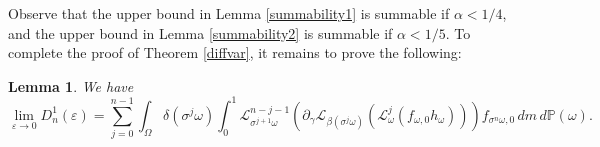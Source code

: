 \documentclass[12pt,reqno,a4paper]{article}
\newtheorem{lemma}[theorem]{Lemma}
\begin{document}

Observe that the upper bound in Lemma \ref{summability1} 
is summable
if $\alpha < 1/4$, and the upper bound in Lemma \ref{summability2}
is summable if $\alpha < 1/5$. To complete the proof of 
Theorem \ref{diffvar}, it remains to prove the following:


\begin{lemma}\label{limitexists2}
	We have
	\[
	\lim_{\varepsilon \to 0}D_n^1(\varepsilon)=\sum_{j=0}^{n-1}\int_\Omega \delta (\sigma^j \omega)\int_0^1\mathcal L_{\sigma^{j+1}\omega}^{n-j-1} \left (\partial_\gamma \mathcal L_{\beta(\sigma^j \omega)}(\mathcal L_\omega^j(f_{\omega, 0}h_\omega))\right )f_{\sigma^n \omega, 0}\, dm\, d\mathbb P(\omega).
	\]
\end{lemma}
\end{document}
